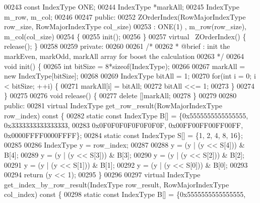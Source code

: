 \begin{DoxyCode}
00243         \textcolor{keyword}{const} IndexType ONE;
00244         IndexType *markAll;
00245         IndexType m\_row, m\_col;
00246 
00247 \textcolor{keyword}{public}:
00252         ZOrderIndex(RowMajorIndexType row\_size, RowMajorIndexType col\_size)
00253                 : ONE(1) , m\_row(row\_size), m\_col(col\_size)
00254         \{
00255                 init();
00256         \}
00257         \textcolor{keyword}{virtual} ~ZOrderIndex() \{ release(); \}
00258 
00259 \textcolor{keyword}{private}:
00260 
00261         \textcolor{comment}{/*}
00262 \textcolor{comment}{         *      @brief : init the markEven, markOdd, markAll array for boost
       the calculation}
00263 \textcolor{comment}{         */}
00264         \textcolor{keywordtype}{void} init() \{
00265                 \textcolor{keywordtype}{int} bitSize = 8*\textcolor{keyword}{sizeof}(IndexType);
00266 
00267                 markAll = \textcolor{keyword}{new} IndexType[bitSize];
00268 
00269                 IndexType bitAll = 1;
00270                 \textcolor{keywordflow}{for}(\textcolor{keywordtype}{int} i = 0; i < bitSize; ++i) \{
00271                         markAll[i] = bitAll;
00272                         bitAll <<= 1;
00273                 \}
00274         \}
00275 
00276         \textcolor{keywordtype}{void} release() \{
00277                 \textcolor{keyword}{delete} []markAll;
00278         \}
00279 
00280 \textcolor{keyword}{public}:
00281         \textcolor{keyword}{virtual} IndexType get_row_result(RowMajorIndexType row\_index)\textcolor{keyword}{ const }\{
00282                 \textcolor{keyword}{static} \textcolor{keyword}{const} IndexType B[] = \{0x5555555555555555, 
      0x3333333333333333,
00283                         0x0F0F0F0F0F0F0F0F, 0x00FF00FF00FF00FF, 
      0x0000FFFF0000FFFF\};
00284                 \textcolor{keyword}{static} \textcolor{keyword}{const} IndexType S[] = \{1, 2, 4, 8, 16\};
00285 
00286                 IndexType y = row\_index;
00287 
00288                 y = (y | (y << S[4])) & B[4];
00289                 y = (y | (y << S[3])) & B[3];
00290                 y = (y | (y << S[2])) & B[2];
00291                 y = (y | (y << S[1])) & B[1];
00292                 y = (y | (y << S[0])) & B[0];
00293 
00294                 \textcolor{keywordflow}{return} (y << 1);
00295         \}
00296 
00297         \textcolor{keyword}{virtual} IndexType get_index_by_row_result(IndexType row\_result, 
      RowMajorIndexType col\_index)\textcolor{keyword}{ const }\{
00298                 \textcolor{keyword}{static} \textcolor{keyword}{const} IndexType B[] = \{0x5555555555555555, 

\end{DoxyCode}
